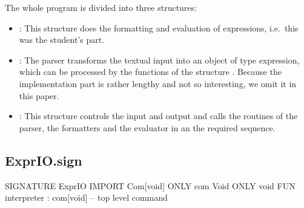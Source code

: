 The whole program is divided into three structures:
\begin{itemize}
\item {}: This structure does the formatting and evaluation of
  expressions, i.e.~this was the student's part.
\item {}: The parser transforms the textual input into an object
  of type expression, which can be processed by the functions of
  the structure . 
  Because the implementation part is rather lengthy and not so
  interesting, we omit it in this paper.
\item {}: This structure controls the input and output and
  calls the routines of the parser, the formatters and  the evaluator
 in an the required sequence.
\end{itemize}


\subsection{ExprIO.sign}
\begin{prog}
SIGNATURE ExprIO
IMPORT  Com[void]       ONLY com
        Void            ONLY void
FUN interpreter : com[void]     -- top level command
\end{prog}

